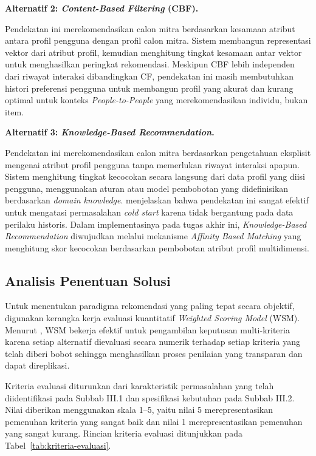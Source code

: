 \textbf{Alternatif 2: \emph{Content-Based Filtering} (CBF).}

Pendekatan ini merekomendasikan calon mitra berdasarkan kesamaan atribut antara profil pengguna dengan profil calon mitra. Sistem membangun representasi vektor dari atribut profil, kemudian menghitung tingkat kesamaan antar vektor untuk menghasilkan peringkat rekomendasi. Meskipun CBF lebih independen dari riwayat interaksi dibandingkan CF, pendekatan ini masih membutuhkan histori preferensi pengguna untuk membangun profil yang akurat dan kurang optimal untuk konteks \emph{People-to-People} yang merekomendasikan individu, bukan item.

\textbf{Alternatif 3: \emph{Knowledge-Based Recommendation}.}

Pendekatan ini merekomendasikan calon mitra berdasarkan pengetahuan eksplisit mengenai atribut profil pengguna tanpa memerlukan riwayat interaksi apapun. Sistem menghitung tingkat kecocokan secara langsung dari data profil yang diisi pengguna, menggunakan aturan atau model pembobotan yang didefinisikan berdasarkan \emph{domain knowledge}. \textcite{burke2002} menjelaskan bahwa pendekatan ini sangat efektif untuk mengatasi permasalahan \emph{cold start} karena tidak bergantung pada data perilaku historis. Dalam implementasinya pada tugas akhir ini, \emph{Knowledge-Based Recommendation} diwujudkan melalui mekanisme \emph{Affinity Based Matching} yang menghitung skor kecocokan berdasarkan pembobotan atribut profil multidimensi.

\subsection{Analisis Penentuan Solusi}

Untuk menentukan paradigma rekomendasi yang paling tepat secara objektif, digunakan kerangka kerja evaluasi kuantitatif \emph{Weighted Scoring Model} (WSM). Menurut \textcite{kumar2022}, WSM bekerja efektif untuk pengambilan keputusan multi-kriteria karena setiap alternatif dievaluasi secara numerik terhadap setiap kriteria yang telah diberi bobot sehingga menghasilkan proses penilaian yang transparan dan dapat direplikasi.

Kriteria evaluasi diturunkan dari karakteristik permasalahan yang telah diidentifikasi pada Subbab III.1 dan spesifikasi kebutuhan pada Subbab III.2. Nilai diberikan menggunakan skala 1--5, yaitu nilai 5 merepresentasikan pemenuhan kriteria yang sangat baik dan nilai 1 merepresentasikan pemenuhan yang sangat kurang. Rincian kriteria evaluasi ditunjukkan pada Tabel~\ref{tab:kriteria-evaluasi}.

